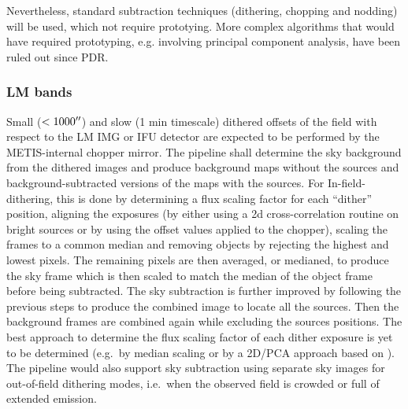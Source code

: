 
Nevertheless, standard subtraction techniques (dithering, chopping and nodding)
will be used, which not require prototying. More complex algorithms that would
have required prototyping, e.g. involving principal component analysis, have been
ruled out since \ac{PDR}.


\subsubsection{LM bands}
Small ($< 1000 \hbox{$^{\prime\prime}$}$) and slow (1 min timescale) dithered offsets of the field with respect to the LM IMG or \ac{IFU} detector are expected to be performed by the METIS-internal chopper mirror.
The pipeline shall determine the sky background from the dithered images and produce background maps without the sources and background-subtracted versions of the maps with the sources.
For In-field-dithering, this is done by determining a flux scaling factor for each ``dither'' position, aligning the exposures (by either using a 2d cross-correlation routine on bright sources or by using the offset values applied to the chopper), scaling the frames to a common median and removing objects by rejecting the highest and lowest pixels.
The remaining pixels are then averaged, or medianed, to produce the sky frame which is then scaled to match the median of the object frame before being subtracted.
The sky subtraction is further improved by following the previous steps to produce the combined image to locate all the sources.
Then the background frames are combined again while excluding the sources positions.
The best approach to determine the flux scaling factor of each dither exposure is yet to be determined (e.g.\ by median scaling or by a 2D/PCA approach based on \cite{Hunziker2018}).
The pipeline would also support sky subtraction using separate sky images for out-of-field dithering modes, i.e.\ when the observed field is crowded or full of extended emission.

